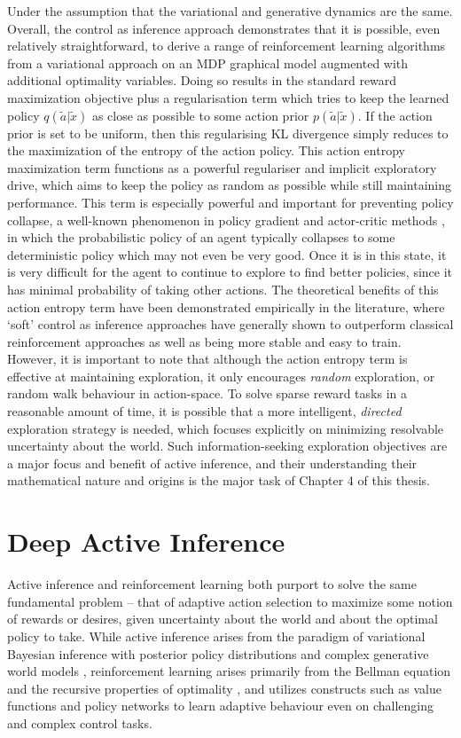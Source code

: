 Under the assumption that the variational and generative dynamics are the same. Overall, the control as inference approach demonstrates that it is possible, even relatively straightforward, to derive a range of reinforcement learning algorithms from a variational approach on an MDP graphical model augmented with additional optimality variables. Doing so results in the standard reward maximization objective plus a regularisation term which tries to keep the learned policy $q(\tilde{a} | \tilde{x})$ as close as possible to some action prior $p(\tilde{a} | \tilde{x})$. If the action prior is set to be uniform, then this regularising KL divergence simply reduces to the maximization of the entropy of the action policy. This action entropy maximization term functions as a powerful regulariser and implicit exploratory drive, which aims to keep the policy as random as possible while still maintaining performance. This term is especially powerful and important for preventing policy collapse, a well-known phenomenon in policy gradient and actor-critic methods \citep{fujimoto2018addressing}, in which the probabilistic policy of an agent typically collapses to some deterministic policy which may not even be very good. Once it is in this state, it is very difficult for the agent to continue to explore to find better policies, since it has minimal probability of taking other actions. The theoretical benefits of this action entropy term have been demonstrated empirically in the literature, where `soft' control as inference approaches have generally shown to outperform classical reinforcement approaches as well as being more stable and easy to train. However, it is important to note that although the action entropy term is effective at maintaining exploration, it only encourages \emph{random} exploration, or random walk behaviour in action-space. To solve sparse reward tasks in a reasonable amount of time, it is possible that a more intelligent, \emph{directed} exploration strategy is needed, which focuses explicitly on minimizing resolvable uncertainty about the world. Such information-seeking exploration objectives are a major focus and benefit of active inference, and their understanding their mathematical nature and origins is the major task of Chapter 4 of this thesis.

\section{Deep Active Inference}

Active inference and reinforcement learning both purport to solve the same fundamental problem -- that of adaptive action selection to maximize some notion of rewards or desires, given uncertainty about the world and about the optimal policy to take. While active inference arises from the paradigm of variational Bayesian inference with posterior policy distributions and complex generative world models \citep{friston_active_2015,friston2017process}, reinforcement learning arises primarily from the Bellman equation and the recursive properties of optimality \citep{sutton2018reinforcement,kaelbling1996reinforcement}, and utilizes constructs such as value functions and policy networks to learn adaptive behaviour even on challenging and complex control tasks.


